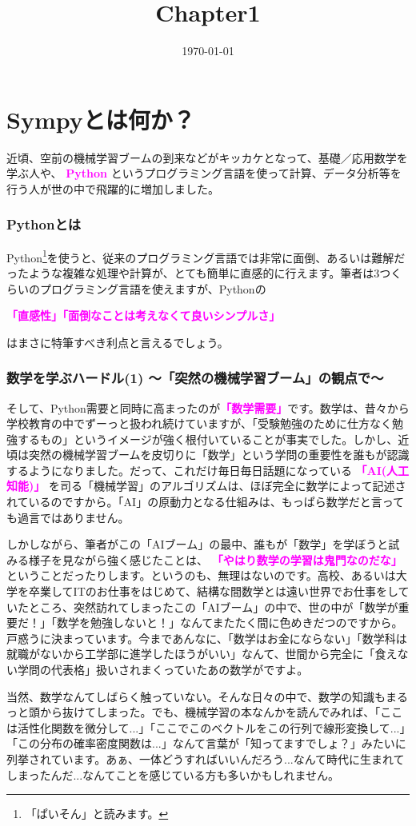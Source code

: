 \documentclass[10pt, a5paper,dvipdfmx]{jsbook}
\title{Chapter1}
\date{\today}
\begin{document}
\tableofcontents
\chapter{Sympyとは何か？}
近頃、空前の機械学習ブームの到来などがキッカケとなって、基礎／応用数学を学ぶ人や、\textcolor{magenta} {
\bf{Python}
}
というプログラミング言語を使って計算、データ分析等を行う人が世の中で飛躍的に増加しました。
\subsection{Pythonとは}
Python\footnote{「ぱいそん」と読みます。}を使うと、従来のプログラミング言語では非常に面倒、あるいは難解だったような複雑な処理や計算が、とても簡単に直感的に行えます。筆者は3つくらいのプログラミング言語を使えますが、Pythonの

\textcolor{magenta}
\bf {「直感性」「面倒なことは考えなくて良いシンプルさ」}

はまさに特筆すべき利点と言えるでしょう。
\subsection{数学を学ぶハードル(1) 〜「突然の機械学習ブーム」の観点で〜}
そして、Python需要と同時に高まったのが\textcolor{magenta}{\bf {「数学需要」}}です。数学は、昔々から学校教育の中でずーっと扱われ続けていますが、「受験勉強のために仕方なく勉強するもの」というイメージが強く根付いていることが事実でした。しかし、近頃は突然の機械学習ブームを皮切りに「数学」という学問の重要性を誰もが認識するようになりました。だって、これだけ毎日毎日話題になっている
\textcolor{magenta}{
\bf{ 「AI(人工知能)」}
}
を司る「機械学習」のアルゴリズムは、ほぼ完全に数学によって記述されているのですから。「AI」の原動力となる仕組みは、もっぱら数学だと言っても過言ではありません。

しかしながら、筆者がこの「AIブーム」の最中、誰もが「数学」を学ぼうと試みる様子を見ながら強く感じたことは、
\textcolor{magenta}{
\bf{「やはり数学の学習は鬼門なのだな」}
}
ということだったりします。というのも、無理はないのです。高校、あるいは大学を卒業してITのお仕事をはじめて、結構な間数学とは遠い世界でお仕事をしていたところ、突然訪れてしまったこの「AIブーム」の中で、世の中が「数学が重要だ！」「数学を勉強しないと！」なんてまたたく間に色めきだつのですから。戸惑うに決まっています。今まであんなに、「数学はお金にならない」「数学科は就職がないから工学部に進学したほうがいい」なんて、世間から完全に「食えない学問の代表格」扱いされまくっていたあの数学がですよ。

当然、数学なんてしばらく触っていない。そんな日々の中で、数学の知識もまるっと頭から抜けてしまった。でも、機械学習の本なんかを読んでみれば、「ここは活性化関数を微分して...」「ここでこのベクトルをこの行列で線形変換して...」「この分布の確率密度関数は...」なんて言葉が「知ってますでしょ？」みたいに列挙されています。あぁ、一体どうすればいいんだろう...なんて時代に生まれてしまったんだ...なんてことを感じている方も多いかもしれません。
\end{document}
